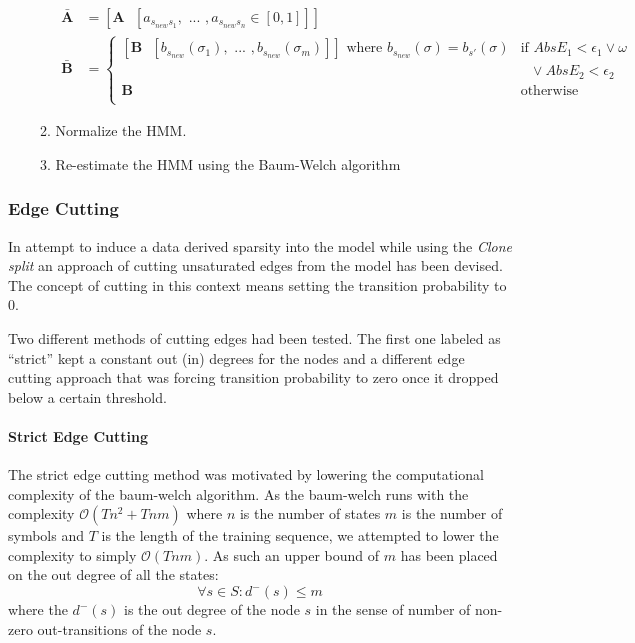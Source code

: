 \begin{enumerate}
\begin{enumerate}
\begin{align*}
	\mathbf{\bar{A}} &= [\mathbf{A} \text{ } [a_{s_{new}s_1}, \text{ ... }, a_{s_{new}s_n} \in [0,1]]] \\
	\mathbf{\bar{B}} &= \begin{cases}
		[\mathbf{B} \text{ } [b_{s_{new}}(\sigma_1), \text{ ... }, b_{s_{new}}(\sigma_m)]]
		\text{ where } b_{s_{new}}(\sigma) = b_{s'}(\sigma)
			&\text{if } AbsE_1 < \epsilon_1 \vee \omega \\ 
			&\text{   }\vee AbsE_2 < \epsilon_2 \\
		\mathbf{B} &\text{otherwise} \\
	\end{cases}
	\end{align*}
	\item Normalize the HMM.
	\item Re-estimate the HMM using the Baum-Welch algorithm
\end{enumerate}

\end{enumerate}

\subsubsection{Edge Cutting}
In attempt to induce a data derived sparsity into the model while using the \emph{Clone split} an approach of cutting unsaturated edges from the model has been devised. The concept of cutting in this context means setting the transition probability to $0$.

Two different methods of cutting edges had been tested. The first one labeled as ``strict'' kept a constant out (in) degrees for the nodes and a different edge cutting approach that was forcing transition probability to zero once it dropped below a certain threshold.

\paragraph {Strict Edge Cutting}
The strict edge cutting method was motivated by lowering the computational complexity of the \gls{baum-welch} algorithm. As the \gls{baum-welch} runs with the complexity $\mathcal{O}(Tn^2+Tnm)$ where $n$ is the number of states $m$ is the number of symbols and $T$ is the length of the training sequence, we attempted to lower the complexity to simply $\mathcal{O}(Tnm)$. As such an upper bound of $m$ has been placed on the out degree of all the states: $$\forall s\in S: d^-(s) \le m$$ where the $d^-(s)$ is the out degree of the node $s$ in the sense of number of non-zero out-transitions of the node $s$.

